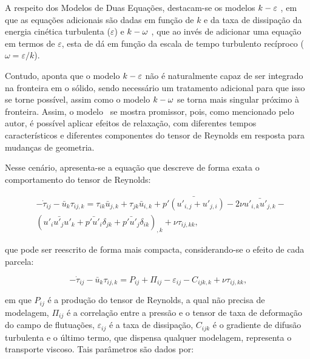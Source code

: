 \documentclass[_ArquivoPrincipal.tex]{subfiles}
\begin{document}
A respeito dos Modelos de Duas Equações, destacam-se os modelos $k-\varepsilon$ \cite{haakansson2012experimental,davidson2014pans,parente2011improved}, em que as equações adicionais são dadas em função de $k$ e da taxa de dissipação da energia cinética turbulenta ($\varepsilon$) e $k-\omega$ \cite{larsen2018over,bassi2005discontinuous}, que ao invés de adicionar uma equação em termos de $\varepsilon$, esta de dá em função da escala de tempo turbulento recíproco ($\omega=\varepsilon/k$).

Contudo,  aponta que o modelo $k-\varepsilon$ não é naturalmente capaz de ser integrado na fronteira em o sólido, sendo necessário um tratamento adicional para que isso se torne possível, assim como o modelo $k-\omega$ se torna mais singular próximo à fronteira. Assim, o modelo \te\ se mostra promissor, pois, como mencionado pelo autor, é possível aplicar efeitos de relaxação, com diferentes tempos característicos e diferentes componentes do tensor de Reynolds em resposta para mudanças de geometria.

Nesse cenário, apresenta-se a equação que descreve de forma exata o comportamento do tensor de Reynolds:

\begin{equation}
    \begin{split}
        &-\dot{\tau}_{ij}-\bar{u}_k\tau_{ij,k}=\tau_{ik}\bar{u}_{j,k}+\tau_{jk}\bar{u}_{i,k}+\bar{p'(u'_{i,j}+u'_{j,i})}-2\nu\bar{u'_{i,k}u'_{j,k}}-\\
        &(\bar{u'_iu'_ju'_k}+\bar{p'u'_i}\delta_{jk}+\bar{p'u'_j}\delta_{ik})_{,k}+\nu\tau_{ij,kk}\text{,}
    \end{split}
\end{equation}

\noindent que pode ser reescrito de forma mais compacta, considerando-se o efeito de cada parcela:

\begin{equation}
    -\dot{\tau}_{ij}-\bar{u}_k\tau_{ij,k}=P_{ij}+\Pi_{ij}-\varepsilon_{ij}-C_{ijk,k}+\nu\tau_{ij,kk}\text{,}
\end{equation}

\noindent em que $P_{ij}$ é a produção do tensor de Reynolds, a qual não precisa de modelagem, $\Pi_{ij}$ é a correlação entre a pressão e o tensor de taxa de deformação do campo de flutuações, $\varepsilon_{ij}$ é a taxa de dissipação, $C_{ijk}$ é o gradiente de difusão turbulenta e o último termo, que dispensa qualquer modelagem, representa o transporte viscoso. Tais parâmetros são dados por:
\end{document}
